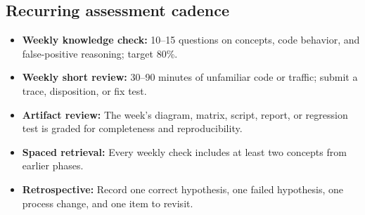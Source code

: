 \documentclass[11pt]{article}
\begin{document}
\subsection{Recurring assessment cadence}
\begin{itemize}
  \item \textbf{Weekly knowledge check:} 10--15 questions on concepts, code behavior, and false-positive reasoning; target 80\%.
  \item \textbf{Weekly short review:} 30--90 minutes of unfamiliar code or traffic; submit a trace, disposition, or fix test.
  \item \textbf{Artifact review:} The week's diagram, matrix, script, report, or regression test is graded for completeness and reproducibility.
  \item \textbf{Spaced retrieval:} Every weekly check includes at least two concepts from earlier phases.
  \item \textbf{Retrospective:} Record one correct hypothesis, one failed hypothesis, one process change, and one item to revisit.
\end{itemize}
\end{document}
